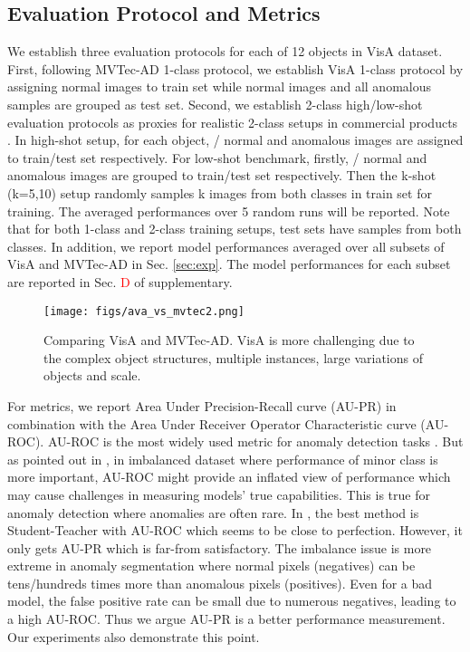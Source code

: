 \documentclass[runningheads]{llncs}
\begin{document}
\subsection{Evaluation Protocol and Metrics}
We establish three evaluation protocols for each of 12 objects in VisA dataset. First, following MVTec-AD 1-class protocol, we establish VisA 1-class protocol by assigning  normal images to train set while  normal images and all anomalous samples are grouped as test set. Second, we establish 2-class high/low-shot evaluation protocols as proxies for realistic 2-class setups in commercial products \cite{LfV,VIAI}. In high-shot setup, for each object, / normal and anomalous images are assigned to train/test set respectively. For low-shot benchmark, firstly, / normal and anomalous images are grouped to train/test set respectively. Then the k-shot (k=5,10) setup randomly samples k images from both classes in train set for training. The averaged performances over 5 random runs will be reported. Note that for both 1-class and 2-class training setups, test sets have samples from both classes. In addition, we report model performances averaged over all subsets of VisA and MVTec-AD in Sec. \ref{sec:exp}. The model performances for each subset are reported in Sec. \textcolor{red}{D} of supplementary.

\begin{figure}[!t]
 \centering
\texttt{[image: figs/ava\_vs\_mvtec2.png]}
\caption{Comparing VisA and MVTec-AD. VisA is more challenging due to the complex object structures, multiple instances, large variations of objects and scale.}
\label{fig:ava_vs_mvtec}
\end{figure}

For metrics, we report Area Under Precision-Recall curve (AU-PR) in combination with the Area Under Receiver Operator Characteristic curve (AU-ROC). AU-ROC is the most widely used metric for anomaly detection tasks \cite{defard2021padim,Roth_2022_CVPR,yi2020patch}. But as pointed out in \cite{cook2020consult,davis2006relationship,saito2015precision}, in imbalanced dataset where performance of minor class is more important, AU-ROC might provide an inflated view of performance which may cause challenges in measuring models' true capabilities. This is true for anomaly detection where anomalies are often rare. In \cite{bergmann2021mvtec}, the best method is Student-Teacher \cite{bergmann2020uninformed} with  AU-ROC which seems to be close to perfection. However, it only gets  AU-PR which is far-from satisfactory. The imbalance issue is more extreme in anomaly segmentation where normal pixels (negatives) can be tens/hundreds times more than anomalous pixels (positives). Even for a bad model, the false positive rate can be small due to numerous negatives, leading to a high AU-ROC. Thus we argue AU-PR is a better performance measurement. Our experiments also demonstrate this point.
\end{document}
